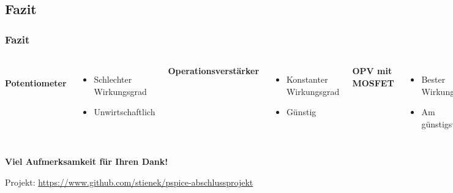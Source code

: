 \documentclass{beamer}
\begin{document}
	\subsection{Fazit}
	\begin{frame}
		\frametitle{Fazit}
		\begin{columns}
			\vspace{15ex}\\
			\textbf{Potentiometer}
			\begin{itemize}
				\item{Schlechter Wirkungsgrad}
				\item{Unwirtschaftlich}
			\end{itemize}
			\textbf{Operationsverstärker}
			\begin{itemize}
				\item{Konstanter Wirkungsgrad}
				\item{Günstig}
			\end{itemize}
			\textbf{OPV mit MOSFET}
			\begin{itemize}
				\item{Bester Wirkungsgrad}
				\item{Am günstigsten}
			\end{itemize}
			\vspace{15ex}
		\end{columns}
	\end{frame}
	\begin{frame}
		\begin{center}
			\textbf{\Huge Viel Aufmerksamkeit für Ihren Dank!}
			
			Projekt: \url{https://www.github.com/stienek/pspice-abschlussprojekt}
		\end{center}
	\end{frame}
\end{document}
